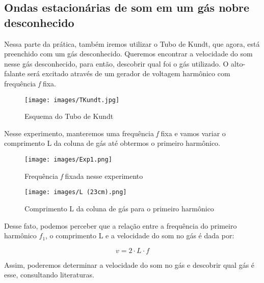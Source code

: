 \subsection{Ondas estacionárias de som em um gás nobre
desconhecido}

Nessa parte da prática, também iremos utilizar o Tubo de Kundt, que agora, está preenchido com um gás desconhecido. Queremos encontrar a velocidade do som nesse gás desconhecido, para então, descobrir qual foi o gás utilizado. O alto-falante será excitado através de um gerador de voltagem harmônico com frequência \textit{f} fixa. 

\begin{figure}[H]
  \centering
  \texttt{[image: images/TKundt.jpg]}
  \caption{Esquema do Tubo de Kundt}
\end{figure}

Nesse experimento, manteremos uma frequência \textit{f} fixa e vamos variar o comprimento L da coluna de gás até obtermos o primeiro harmônico. 

\begin{figure}[H]
  \centering
  \texttt{[image: images/Exp1.png]}
  \caption{Frequência \textit{f} fixada nesse experimento}
\end{figure}

\begin{figure}[H]
  \centering
  \texttt{[image: images/L (23cm).png]}
  \caption{Comprimento L da coluna de gás para o primeiro harmônico}
\end{figure}

Desse fato, podemos perceber que a relação entre a frequência do primeiro harmônico $f_1$, o comprimento L e a velocidade do som no gás é dada por:

\[ v = 2 \cdot L \cdot f\]

Assim, poderemos determinar a velocidade do som no gás e descobrir qual gás é esse, consultando literaturas.
